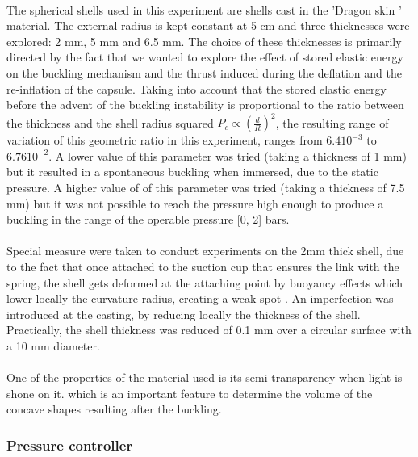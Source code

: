 \paragraph{}
The spherical shells used in this experiment are shells cast in the 'Dragon skin ' material. The external radius is kept constant at 5 cm and three thicknesses were explored: 2 mm, 5 mm and 6.5 mm.
The choice of these thicknesses is primarily directed by the fact that we wanted to explore the effect of stored elastic energy on the buckling mechanism and the thrust induced during the deflation and the re-inflation of the capsule. Taking into account that the stored elastic energy before the advent of the buckling instability is proportional to the ratio between the thickness and the shell radius squared \cite{cqpcritic2011} $P_c \propto (\frac{d}{R})^2$, the resulting range of variation of this geometric ratio in this experiment, ranges from $6.4 10^{-3}$ to $6.76 10^{-2}$.
A lower value of this parameter was tried (taking a thickness of 1 mm) but it resulted in a spontaneous buckling when immersed, due to the static pressure.
A higher value of of this parameter was tried (taking a thickness of 7.5 mm) but it was not possible to reach the pressure high enough to produce a buckling in the range of the operable pressure [0, 2] bars.
\paragraph{}
Special measure were taken to conduct experiments on the 2mm thick shell, due to the fact that once attached to the suction cup that ensures the link with the spring, the shell gets deformed at the attaching point by buoyancy effects which lower locally the curvature radius, creating a weak spot \cite{cqpcritic2011}. An imperfection was introduced at the casting, by reducing locally the thickness of the shell. Practically, the shell thickness was reduced of 0.1 mm over a circular surface with a 10 mm diameter.
\paragraph{}
One of the properties of the material used is its semi-transparency when light is shone on it. which is an important feature to determine the volume of the concave shapes resulting after the buckling.

\subsubsection{Pressure controller}
